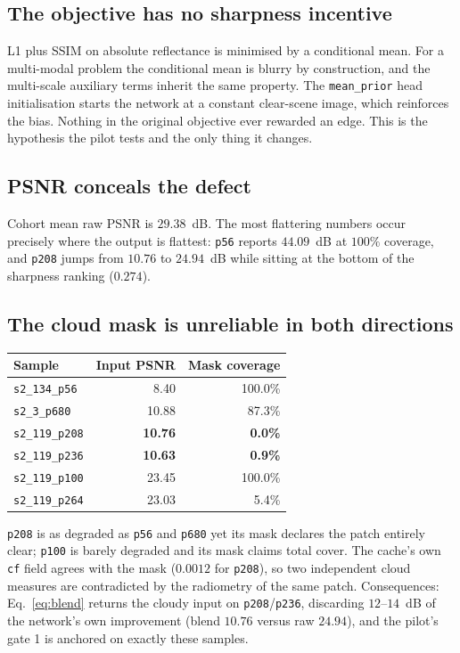 \documentclass[10pt,a4paper]{article}
\newcommand{\code}[1]{\texttt{#1}}
\begin{document}
\subsection{The objective has no sharpness incentive}

L1 plus SSIM on absolute reflectance is minimised by a conditional mean. For a multi-modal problem
the conditional mean is blurry by construction, and the multi-scale auxiliary terms inherit the
same property. The \code{mean\_prior} head initialisation starts the network at a constant
clear-scene image, which reinforces the bias. Nothing in the original objective ever rewarded an
edge. This is the hypothesis the pilot tests and the only thing it changes.

\subsection{PSNR conceals the defect}

Cohort mean raw PSNR is $29.38$~dB. The most flattering numbers occur precisely where the output is
flattest: \code{p56} reports $44.09$~dB at $100\%$ coverage, and \code{p208} jumps from $10.76$ to
$24.94$~dB while sitting at the bottom of the sharpness ranking ($0.274$).

\subsection{The cloud mask is unreliable in both directions}

\begin{center}
\begin{tabular}{@{}lrr@{}}
\hline
Sample & Input PSNR & Mask coverage \\
\hline
\code{s2\_134\_p56}   & 8.40 & 100.0\% \\
\code{s2\_3\_p680}    & 10.88 & 87.3\% \\
\code{s2\_119\_p208}  & \textbf{10.76} & \textbf{0.0\%} \\
\code{s2\_119\_p236}  & \textbf{10.63} & \textbf{0.9\%} \\
\code{s2\_119\_p100}  & 23.45 & 100.0\% \\
\code{s2\_119\_p264}  & 23.03 & 5.4\% \\
\hline
\end{tabular}
\end{center}

\code{p208} is as degraded as \code{p56} and \code{p680} yet its mask declares the patch entirely
clear; \code{p100} is barely degraded and its mask claims total cover. The cache's own \code{cf}
field agrees with the mask ($0.0012$ for \code{p208}), so two independent cloud measures are
contradicted by the radiometry of the same patch. Consequences: Eq.~\eqref{eq:blend} returns the
cloudy input on \code{p208}/\code{p236}, discarding $12$--$14$~dB of the network's own improvement
(blend $10.76$ versus raw $24.94$), and the pilot's gate 1 is anchored on exactly these samples.
\end{document}
